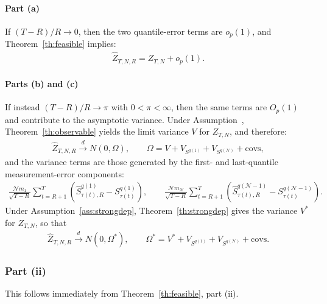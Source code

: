 \paragraph{Part (a)} If $(T-R)/R\rightarrow 0$, then the two quantile-error terms are $o_p(1)$, and Theorem~\ref{th:feasible} implies:
\begin{align*}
\widehat{Z}_{T,N,R}=Z_{T,N}+o_p(1).
\end{align*}

\paragraph{Parts (b) and (c)} If instead $(T-R)/R\rightarrow \pi$ with $0<\pi<\infty$, then the same terms are $O_p(1)$ and contribute to the asymptotic variance. Under Assumption~, Theorem~\ref{th:observable} yields the limit variance $V$ for $Z_{T,N}$, and therefore:
\begin{align*}
\widehat{Z}_{T,N,R}\overset{d}{\rightarrow}N\left( 0,\Omega \right), 
\qquad
\Omega =V+V_{S^{q(1)}}+V_{S^{q(\mathcal{N})}}+\mathrm{covs},
\end{align*}
and the variance terms are those generated by the first- and last-quantile measurement-error components:
\begin{align*}
\frac{\mathcal{N}m_{1}}{\sqrt{T-R}}\sum_{t=R+1}^{T}\left( \widehat{S}_{\tau(t),R}^{q(1)}-S_{\tau(t)}^{q(1)}\right),
\qquad
\frac{\mathcal{N}m_{\mathcal{N}}}{\sqrt{T-R}}\sum_{t=R+1}^{T}\left( \widehat{S}_{\tau(t),R}^{q(\mathcal{N}-1)}-S_{\tau(t)}^{q(\mathcal{N}-1)}\right).
\end{align*}
Under Assumption~\ref{ass:strongdep}, Theorem~\ref{th:strongdep} gives the variance $V^{\ast}$ for $Z_{T,N}$, so that
\begin{align*}
\widehat{Z}_{T,N,R}\overset{d}{\rightarrow}N\left( 0,\Omega^{\ast} \right),
\qquad
\Omega^{\ast}=V^{\ast}+V_{S^{q(1)}}+V_{S^{q(\mathcal{N})}}+\mathrm{covs}.
\end{align*}

\subsubsection{Part (ii)}

This follows immediately from Theorem~\ref{th:feasible}, part (ii).




